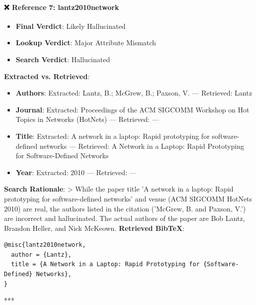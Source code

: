 \documentclass[11pt,a4paper]{article}
\begin{document}
\paragraph{❌ Reference 7: lantz2010network}
\begin{itemize}[leftmargin=1.8em,itemsep=2pt]
\item \textbf{Final Verdict}: Likely Hallucinated
\item \textbf{Lookup Verdict}: Major Attribute Mismatch
\item \textbf{Search Verdict}: Hallucinated
\end{itemize}
\textbf{Extracted vs. Retrieved}:
\begin{itemize}[leftmargin=1.8em,itemsep=2pt]
\item \textbf{Authors}: Extracted: Lantz, B.; McGrew, B.; Paxson, V. — Retrieved: Lantz
\item \textbf{Journal}: Extracted: Proceedings of the ACM SIGCOMM Workshop on Hot Topics in Networks (HotNets) — Retrieved: —
\item \textbf{Title}: Extracted: A network in a laptop: Rapid prototyping for software-defined networks — Retrieved: A Network in a Laptop: Rapid Prototyping for Software-Defined Networks
\item \textbf{Year}: Extracted: 2010 — Retrieved: —
\end{itemize}
\textbf{Search Rationale}:
> While the paper title 'A network in a laptop: Rapid prototyping for software-defined networks' and venue (ACM SIGCOMM HotNets 2010) are real, the authors listed in the citation ('McGrew, B. and Paxson, V.') are incorrect and hallucinated. The actual authors of the paper are Bob Lantz, Brandon Heller, and Nick McKeown.
\textbf{Retrieved BibTeX}:
\begin{Verbatim}[fontsize=\small]
@misc{lantz2010network,
  author = {Lantz},
  title = {A Network in a Laptop: Rapid Prototyping for {Software-Defined} Networks},
}
\end{Verbatim}
***
\end{document}
